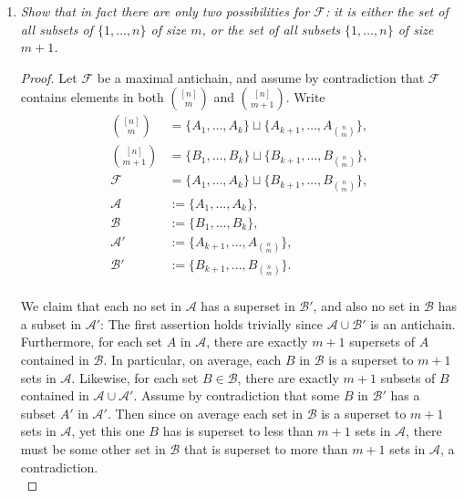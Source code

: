 \documentclass{article}
\begin{document}
\begin{enumerate}
\begin{enumerate}
      \item \it Show that in fact there are only two possibilities for
        $\mathcal{F}$: it is either the set of all subsets of
        $\{1,\ldots,n\}$ of size $m$, or the set of all subsets
        $\{1,\ldots,n\}$ of size $m+1$.

        \begin{proof}
          Let $\mathcal{F}$ be a maximal antichain, and assume by
          contradiction that $\mathcal{F}$ contains elements in both
          $\binom{[n]}{m}$ and $\binom{[n]}{m+1}$. Write
          \begin{align*}
            \binom{[n]}{m} &=\{A_1,\ldots,A_k\} \sqcup
              \{A_{k+1},\ldots,A_{\binom{n}{m}}\},\\
            \binom{[n]}{m+1} &=\{B_1,\ldots,B_k\} \sqcup
              \{B_{k+1},\ldots,B_{\binom{n}{m}}\},\\
            \mathcal{F} &=\{A_1,\ldots,A_k\} \sqcup
              \{B_{k+1},\ldots,B_{\binom{n}{m}}\},\\
            \mathcal{A} &:=\{A_1,\ldots,A_k\},\\
            \mathcal{B} &:=\{B_1,\ldots,B_k\},\\
            \mathcal{A}' &:=\{A_{k+1},\ldots,A_{\binom{n}{m}}\},\\
            \mathcal{B}' &:=\{B_{k+1},\ldots,B_{\binom{n}{m}}\}.\\
          \end{align*}

          We claim that each no set in $\mathcal{A}$ has a superset in
          $\mathcal{B}'$, and also no set in $\mathcal{B}$ has a subset in
          $\mathcal{A}'$: The first assertion holds trivially since
          $\mathcal{A}\cup\mathcal{B}'$ is an antichain. Furthermore, for
          each set $A$ in $\mathcal{A}$, there are exactly $m+1$ supersets
          of $A$ contained in $\mathcal{B}$. In particular, on average,
          each $B$ in $\mathcal{B}$ is a superset to $m+1$ sets in
          $\mathcal{A}$. Likewise, for each set $B\in\mathcal{B}$, there
          are exactly $m+1$ subsets of $B$ contained in
          $\mathcal{A}\cup\mathcal{A}'$. Assume by contradiction that some
          $B$ in $\mathcal{B}'$ has a subset $A'$ in $\mathcal{A}'$. Then
          since on average each set in $\mathcal{B}$ is a superset to $m+1$
          sets in $\mathcal{A}$, yet this one $B$ has is superset to less
          than $m+1$ sets in $\mathcal{A}$, there must be some other set in
          $\mathcal{B}$ that is superset to more than $m+1$ sets in
          $\mathcal{A}$, a contradiction. \\
        \end{proof}
    \end{enumerate}
\end{enumerate}
\end{document}
